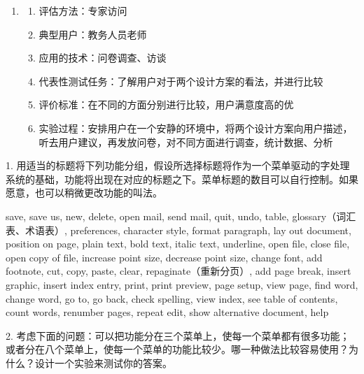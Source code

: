 \begin{solution}
\begin{enumerate}[label=\alph*.]
\begin{enumerate}[label=\arabic*.]
    \end{enumerate}
    \item 
    \begin{enumerate}[label=\arabic*.]
        \item 评估方法：专家访问
        \item 典型用户：教务人员老师
        \item 应用的技术：问卷调查、访谈
        \item 代表性测试任务：了解用户对于两个设计方案的看法，并进行比较
        \item 评价标准：在不同的方面分别进行比较，用户满意度高的优
        \item 实验过程：安排用户在一个安静的环境中，将两个设计方案向用户描述，听去用户建议，再发放问卷，对不同方面进行调查，统计数据、分析
    \end{enumerate}
\end{enumerate}
\end{solution}



\begin{problem}[2012]
1. 用适当的标题将下列功能分组，假设所选择标题将作为一个菜单驱动的字处理系统的基础，功能将出现在对应的标题之下。菜单标题的数目可以自行控制。如果愿意，也可以稍微更改功能的叫法。
    
save, save us, new, delete, open mail, send mail, quit, undo, table, glossary（词汇表、术语表）, preferences, character style, format paragraph, lay out document, position on page, plain text, bold text, italic text, underline, open file, close file, open copy of file, increase point size, decrease point size, change font, add footnote, cut, copy, paste, clear, repaginate（重新分页）, add page break, insert graphic, insert index entry, print, print preview, page setup, view page, find word, change word, go to, go back, check spelling, view index, see table of contents, count words, renumber pages, repeat edit, show alternative document, help

2. 考虑下面的问题：可以把功能分在三个菜单上，使每一个菜单都有很多功能；或者分在八个菜单上，使每一个菜单的功能比较少。哪一种做法比较容易使用？为什么？设计一个实验来测试你的答案。
\end{problem}

